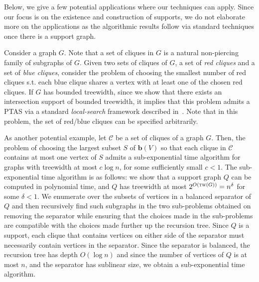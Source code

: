 \documentclass[12pt]{article}
\newcommand{\B}{\mathbf{b}}
\newcommand{\tw}{\textsc{tw}}
\theoremstyle{case}
\begin{document}
Below, we give a few potential applications where our techniques
can apply. Since our focus is on the existence and construction of
supports, we do not elaborate more on the applications as the
algorithmic results follow via standard techniques once there
is a support graph.

Consider a graph $G$. Note that a set of cliques in $G$ is
a natural non-piercing family of subgraphs of $G$. Given two
sets of cliques of $G$, a set of \emph{red cliques} and a
set of \emph{blue cliques}, consider the problem of 
choosing the smallest number of red cliques s.t. each blue clique shares a vertex
with at least one of the chosen red cliques.
If $G$ has bounded treewidth, since we show that there exists an intersection support
of bounded treewidth, it implies that this problem admits a PTAS via a standard
\emph{local-search} framework described in~\cite{DBLP:conf/walcom/AschnerKMY13,ChanH12, mustafa2010improved}. Note that in this problem, the set of 
red/blue cliques can be specified arbitrarily.

As another potential example,  
let $\mathcal{C}$ be a set of cliques of a graph $G$. 
Then, the problem of choosing the largest subset $S$ of
$\B(V)$ so that each clique in $\mathcal{C}$ contains
at most one vertex of $S$ admits a sub-exponential time
algorithm for graphs with treewidth at most $c\log n$, 
for some sufficiently small $c<1$. 
The sub-exponential time algorithm is as follows: 
we show that a support graph $Q$
can be computed in polynomial time, and $Q$ has treewidth
at most $2^{O(\tw(G))}=n^{\delta}$ for some $\delta<1$.
We enumerate over the subsets of vertices in a 
balanced separator of $Q$ and then recursively find
such subgraphs in the two sub-problems obtained on removing
the separator while ensuring that the choices made
in the sub-problems are compatible with the choices made
further up the recursion tree. 
Since $Q$ is a support, each clique that
contains vertices on either side of the separator must necessarily
contain vertices in the separator. Since the separator is balanced,
the recursion tree has depth $O(\log n)$ and 
since the number of vertices of $Q$ is at most $n$, and
the separator has sublinear size, we obtain a
sub-exponential time algorithm.
\end{document}
